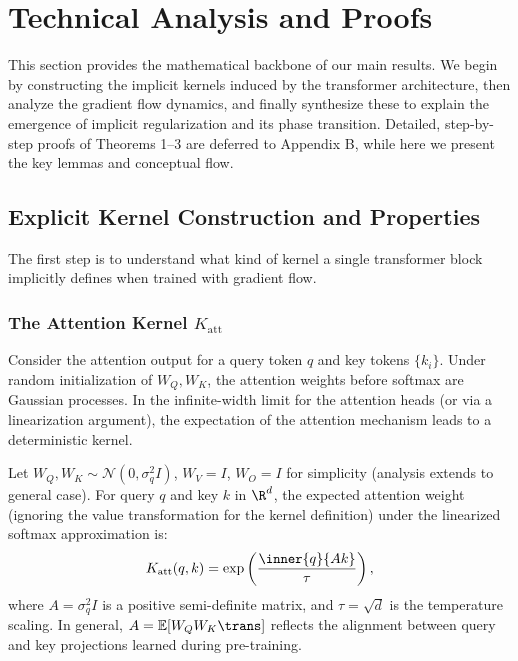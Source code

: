 	\section{Technical Analysis and Proofs}
	\label{sec:technical}
	
	This section provides the mathematical backbone of our main results. We begin by constructing the implicit kernels induced by the transformer architecture, then analyze the gradient flow dynamics, and finally synthesize these to explain the emergence of implicit regularization and its phase transition. Detailed, step-by-step proofs of Theorems 1–3 are deferred to Appendix B, while here we present the key lemmas and conceptual flow.
	
	\subsection{Explicit Kernel Construction and Properties}
	\label{subsec:kernels}
	
	The first step is to understand what kind of kernel a single transformer block implicitly defines when trained with gradient flow.
	
	\subsubsection{The Attention Kernel $K_{\text{att}}$}
	\label{subsubsec:att_kernel}
	
	Consider the attention output for a query token $q$ and key tokens $\{k_i\}$. Under random initialization of $W_Q, W_K$, the attention weights before softmax are Gaussian processes. In the infinite-width limit for the attention heads (or via a linearization argument), the expectation of the attention mechanism leads to a deterministic kernel.
	
	\begin{lemma}
		\label{lem:att_kernel}
		Let $W_Q, W_K \sim \mathcal{N}(0, \sigma_q^2 I)$, $W_V = I$, $W_O = I$ for simplicity (analysis extends to general case). For query $q$ and key $k$ in $\R^d$, the expected attention weight (ignoring the value transformation for the kernel definition) under the linearized softmax approximation is:
		\[
		K_{\text{att}}(q, k) = \exp\left(\frac{\inner{q}{A k}}{\tau}\right),
		\]
		where $A = \sigma_q^2 I$ is a positive semi-definite matrix, and $\tau = \sqrt{d}$ is the temperature scaling. In general, $A = \mathbb{E}[W_Q W_K\trans]$ reflects the alignment between query and key projections learned during pre-training.
	\end{lemma}
	
